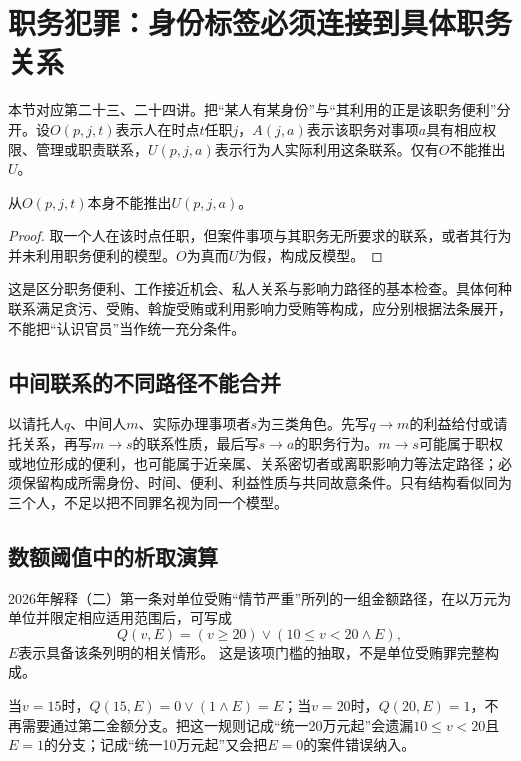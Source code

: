 
\section{职务犯罪：身份标签必须连接到具体职务关系}
本节对应第二十三、二十四讲。把“某人有某身份”与“其利用的正是该职务便利”分开。设$O(p,j,t)$表示人在时点$t$任职$j$，$A(j,a)$表示该职务对事项$a$具有相应权限、管理或职责联系，$U(p,j,a)$表示行为人实际利用这条联系。仅有$O$不能推出$U$。

\begin{modelprop}[任职事实不能独立证明职务利用]
从$O(p,j,t)$本身不能推出$U(p,j,a)$。
\end{modelprop}
\begin{proof}
取一个人在该时点任职，但案件事项与其职务无所要求的联系，或者其行为并未利用职务便利的模型。$O$为真而$U$为假，构成反模型。
\end{proof}

这是区分职务便利、工作接近机会、私人关系与影响力路径的基本检查。具体何种联系满足贪污、受贿、斡旋受贿或利用影响力受贿等构成，应分别根据法条展开，不能把“认识官员”当作统一充分条件。

\subsection{中间联系的不同路径不能合并}
以请托人$q$、中间人$m$、实际办理事项者$s$为三类角色。先写$q\to m$的利益给付或请托关系，再写$m\to s$的联系性质，最后写$s\to a$的职务行为。$m\to s$可能属于职权或地位形成的便利，也可能属于近亲属、关系密切者或离职影响力等法定路径；必须保留构成所需身份、时间、便利、利益性质与共同故意条件。只有结构看似同为三个人，不足以把不同罪名视为同一个模型。

\subsection{数额阈值中的析取演算}
2026年解释（二）第一条对单位受贿“情节严重”所列的一组金额路径，在以万元为单位并限定相应适用范围后，可写成
\[
 Q(v,E)=(v\ge20)\vee(10\le v<20\wedge E),
\]
$E$表示具备该条列明的相关情形。 这是该项门槛的抽取，不是单位受贿罪完整构成。

当$v=15$时，$Q(15,E)=0\vee(1\wedge E)=E$；当$v=20$时，$Q(20,E)=1$，不再需要通过第二金额分支。把这一规则记成“统一20万元起”会遗漏$10\le v<20$且$E=1$的分支；记成“统一10万元起”又会把$E=0$的案件错误纳入。

